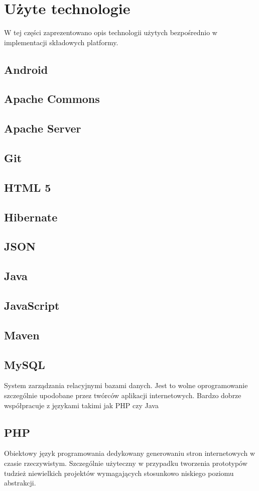 \documentclass[11pt,a4paper,polish,thesis]{dcsbook}
\begin{document}
\section{Użyte technologie}
W tej części zaprezentowano opis technologii użytych bezpośrednio w implementacji składowych platformy.
\subsection{Android}
\subsection{Apache Commons}
\subsection{Apache Server}
\subsection{Git}
\subsection{HTML 5}
\subsection{Hibernate}
\subsection{JSON}
\subsection{Java}
\subsection{JavaScript}
\subsection{Maven}
\subsection{MySQL}
System zarządzania relacyjnymi bazami danych. Jest to wolne oprogramowanie szczególnie upodobane przez twórców aplikacji internetowych. Bardzo dobrze współpracuje z językami takimi jak PHP czy Java
\subsection{PHP}
Obiektowy język programowania dedykowany generowaniu stron internetowych w czasie rzeczywistym. Szczególnie użyteczny w przypadku tworzenia prototypów tudzież niewielkich projektów wymagających stosunkowo niskiego poziomu abstrakcji.
\end{document}
